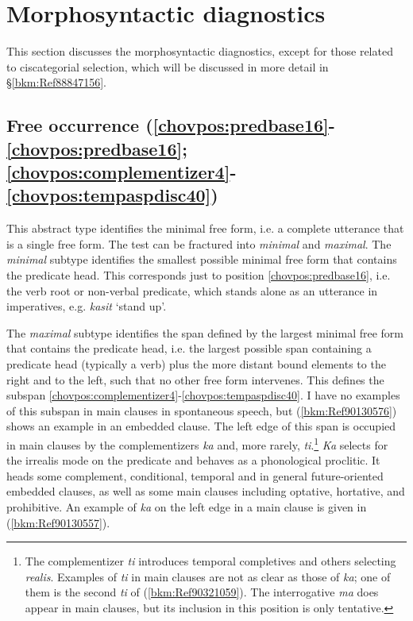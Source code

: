 \documentclass[output=paper]{langscibook}
\begin{document}
\section{Morphosyntactic diagnostics}
\largerpage
\label{bkm:Ref82962135}
This section discusses the morphosyntactic diagnostics, except for those related to ciscategorial selection, which will be discussed in more detail in §\ref{bkm:Ref88847156}.
\subsection{Free occurrence (\ref{chovpos:predbase16}{}-\ref{chovpos:predbase16}; \ref{chovpos:complementizer4}{}-\ref{chovpos:tempaspdisc40})}
\label{bkm:Ref90253511}

This abstract type identifies the minimal free form, i.e. a complete utterance that is a single free form. The test can be fractured into \textit{minimal} and \textit{maximal}. The \textit{minimal} subtype identifies the smallest possible minimal free form that contains the predicate head. This corresponds just to position \ref{chovpos:predbase16}, i.e. the verb root or non-verbal predicate, which stands alone as an utterance in imperatives, e.g. \textit{kasit} `stand up'. 

The \textit{maximal} subtype identifies the span defined by the largest minimal free form that contains the predicate head, i.e. the largest possible span containing a predicate head (typically a verb) plus the more distant bound elements to the right and to the left, such that no other free form intervenes. This defines the subspan \ref{chovpos:complementizer4}{}-\ref{chovpos:tempaspdisc40}. I have no examples of this subspan in main clauses in spontaneous speech, but (\ref{bkm:Ref90130576}) shows an example in an embedded clause. The left edge of this span is occupied in main clauses by the complementizers \textit{ka} and, more rarely, \textit{ti}.\footnote{The complementizer \textit{ti} introduces temporal completives and others selecting \textit{realis}. Examples of \textit{ti} in main clauses are not as clear as those of \textit{ka}; one of them is the second \textit{ti} of (\ref{bkm:Ref90321059}). The interrogative \textit{ma} does appear in main clauses, but its inclusion in this position is only tentative.} \textit{Ka} selects for the irrealis mode on the predicate and behaves as a phonological proclitic. It heads some complement, conditional, temporal and in general future-oriented embedded clauses, as well as some main clauses including optative, hortative, and prohibitive. An example of \textit{ka} on the left edge in a main clause is given in (\ref{bkm:Ref90130557}). 
\end{document}
